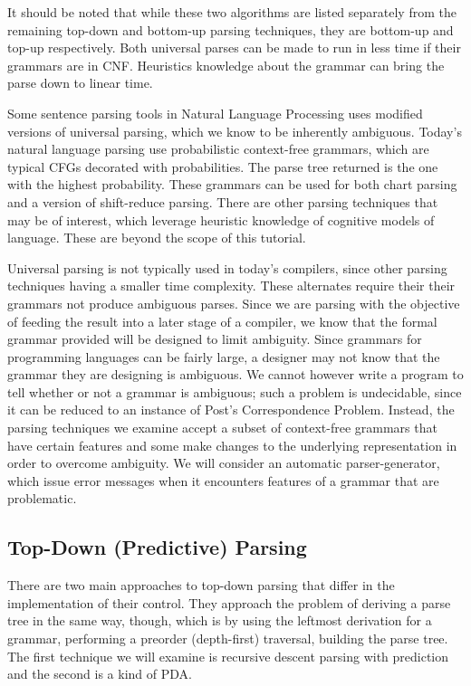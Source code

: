 \documentclass[a4paper, 10pt]{article}
\begin{document}
It should be noted that while these two algorithms are listed separately from the remaining top-down and bottom-up parsing techniques, they are bottom-up and top-up respectively. Both universal parses can be made to run in less time if their grammars are in CNF. Heuristics knowledge about the grammar can bring the parse down to linear time. 

Some sentence parsing tools in Natural Language Processing uses modified versions of universal parsing, which we know to be inherently ambiguous. Today's natural language parsing use probabilistic context-free grammars, which are typical CFGs decorated with probabilities. The parse tree returned is the one with the highest probability. These grammars can be used for both chart parsing and a version of shift-reduce parsing. There are other parsing techniques that may be of interest, which leverage heuristic knowledge of cognitive models of language. These are beyond the scope of this tutorial.

Universal parsing is not typically used in today's compilers, since other parsing techniques having a smaller time complexity. These alternates require their their grammars not produce ambiguous parses. Since we are parsing with the objective of feeding the result into a later stage of a compiler, we know that the formal grammar provided will be designed to limit ambiguity. Since grammars for programming languages can be fairly large, a designer may not know that the grammar they are designing is ambiguous. We cannot however write a program to tell whether or not a grammar is ambiguous; such a problem is undecidable, since it can be reduced to an instance of Post's Correspondence Problem. Instead, the parsing techniques we examine accept a subset of context-free grammars that have certain features and some make changes to the underlying representation in order to overcome ambiguity. We will consider an automatic parser-generator, which issue error messages when it encounters features of a grammar that are problematic.

\subsection{Top-Down (Predictive) Parsing}\label{sec:top}
There are two main approaches to top-down parsing that differ in the implementation of their control. They approach the problem of deriving a parse tree in the same way, though, which is by using the leftmost derivation for a grammar, performing a preorder (depth-first) traversal, building the parse tree. The first technique we will examine is recursive descent parsing with prediction and the second is a kind of PDA. 
\end{document}
